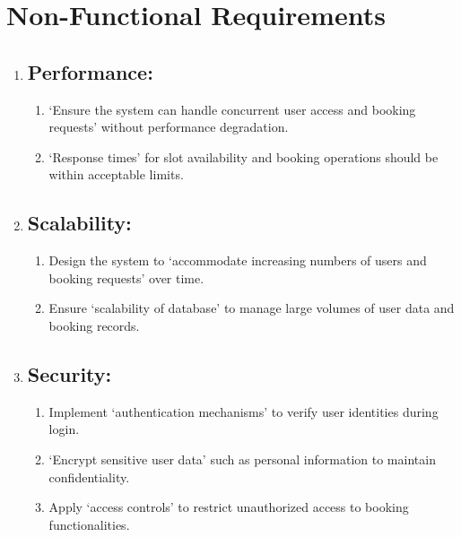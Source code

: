 \documentclass[12pt]{article}
\begin{document}
\section{Non-Functional Requirements}

\begin{enumerate}[label=\arabic*.]
    \item[] \subsection{Performance:}
    \begin{enumerate}[label=\alph*)]
        \item `Ensure the system can handle concurrent user access and booking requests' without performance degradation.
        \item `Response times' for slot availability and booking operations should be within acceptable limits.
    \end{enumerate}

    \vspace{0.4cm}

    \item[] \subsection{Scalability:}
    \begin{enumerate}[label=\alph*)]
        \item Design the system to `accommodate increasing numbers of users and booking requests' over time.
        \item Ensure `scalability of database' to manage large volumes of user data and booking records.
    \end{enumerate}

    \vspace{0.4cm}

    \item[] \subsection{Security:}
    \begin{enumerate}[label=\alph*)]
        \item Implement `authentication mechanisms' to verify user identities during login.
        \item `Encrypt sensitive user data' such as personal information to maintain confidentiality.
        \item Apply `access controls' to restrict unauthorized access to booking functionalities.
    \end{enumerate}


\end{enumerate}
\end{document}
